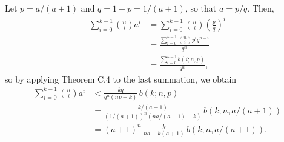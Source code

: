 Let $p=a/(a+1)$ and $q=1-p=1/(a+1)$, so that $a=p/q$.
Then,
\begin{align*}
    \sum_{i=0}^{k-1}\binom{n}{i}a^i &= \sum_{i=0}^{k-1}\binom{n}{i}\left(\frac{p}{q}\right)^i \\[1mm]
    &= \frac{\sum_{i=0}^{k-1}\binom{n}{i}p^iq^{n-i}}{q^n} \\[1mm]
    &= \frac{\sum_{i=0}^{k-1}b(i;n,p)}{q^n},
\end{align*}
so by applying Theorem C.4 to the last summation, we obtain
\begin{align*}
    \sum_{i=0}^{k-1}\binom{n}{i}a^i &< \frac{kq}{q^n(np-k)}\,b(k;n,p) \\
    &= \frac{k/(a+1)}{(1/(a+1))^n(na/(a+1)-k)}\,b(k;n,a/(a+1)) \\[1mm]
    &= (a+1)^n\,\frac{k}{na-k(a+1)}\,b(k;n,a/(a+1)).
\end{align*}

